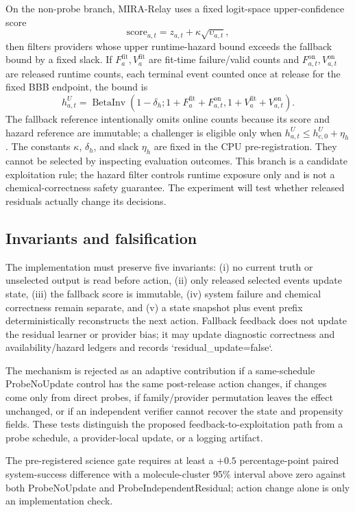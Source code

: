 \documentclass[sigconf,anonymous]{aamas}
\begin{document}
On the non-probe branch, MIRA-Relay uses a fixed logit-space upper-confidence score
$$
\mathrm{score}_{a,t}=z_{a,t}+\kappa\sqrt{\upsilon_{a,t}},
$$
then filters providers whose upper runtime-hazard bound exceeds the fallback bound by a fixed slack. If
$F^{\mathrm{fit}}_a,V^{\mathrm{fit}}_a$ are fit-time failure/valid counts and
$F^{\mathrm{on}}_{a,t},V^{\mathrm{on}}_{a,t}$ are released runtime counts, each terminal event
counted once at release for the fixed BBB endpoint, the bound is
$$
h^U_{a,t}=\operatorname{BetaInv}\!\left(1-\delta_h;
1+F^{\mathrm{fit}}_a+F^{\mathrm{on}}_{a,t},
1+V^{\mathrm{fit}}_a+V^{\mathrm{on}}_{a,t}\right).
$$
The fallback reference intentionally omits online counts because its score and hazard reference
are immutable; a challenger is eligible only when
$h^U_{a,t}\leq h^U_{c,0}+\eta_h$. The constants $\kappa$, $\delta_h$, and slack $\eta_h$ are fixed
in the CPU pre-registration. They cannot be selected by inspecting evaluation outcomes. This branch
is a candidate exploitation rule; the hazard filter controls runtime exposure only and is not a
chemical-correctness safety guarantee. The experiment will test whether released residuals actually
change its decisions.

\subsection{Invariants and falsification}
The implementation must preserve five invariants: (i) no current truth or unselected output is read before action, (ii) only released selected events update state, (iii) the fallback score is immutable, (iv) system failure and chemical correctness remain separate, and (v) a state snapshot plus event prefix deterministically reconstructs the next action. Fallback feedback does not update the residual learner or provider bias; it may update diagnostic correctness and availability/hazard ledgers and records `residual\_update=false`.

The mechanism is rejected as an adaptive contribution if a same-schedule ProbeNoUpdate control has the same post-release action changes, if changes come only from direct probes, if family/provider permutation leaves the effect unchanged, or if an independent verifier cannot recover the state and propensity fields. These tests distinguish the proposed feedback-to-exploitation path from a probe schedule, a provider-local update, or a logging artifact.

The pre-registered science gate requires at least a $+0.5$ percentage-point paired system-success difference with a molecule-cluster 95\% interval above zero against both ProbeNoUpdate and ProbeIndependentResidual; action change alone is only an implementation check.
\end{document}
